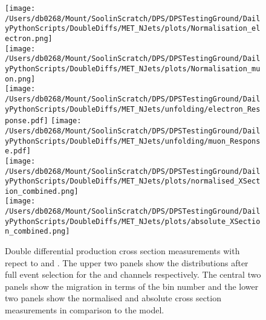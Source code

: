 \begin{figure}[htpb]
	\centering
	\texttt{[image: /Users/db0268/Mount/SoolinScratch/DPS/DPSTestingGround/DailyPythonScripts/DoubleDiffs/MET\_NJets/plots/Normalisation\_electron.png]} \\
	\texttt{[image: /Users/db0268/Mount/SoolinScratch/DPS/DPSTestingGround/DailyPythonScripts/DoubleDiffs/MET\_NJets/plots/Normalisation\_muon.png]} \\
	\vspace{0.8cm}
	\texttt{[image: /Users/db0268/Mount/SoolinScratch/DPS/DPSTestingGround/DailyPythonScripts/DoubleDiffs/MET\_NJets/unfolding/electron\_Response.pdf]}
	\texttt{[image: /Users/db0268/Mount/SoolinScratch/DPS/DPSTestingGround/DailyPythonScripts/DoubleDiffs/MET\_NJets/unfolding/muon\_Response.pdf]} \\
	\vspace{0.8cm}
	\texttt{[image: /Users/db0268/Mount/SoolinScratch/DPS/DPSTestingGround/DailyPythonScripts/DoubleDiffs/MET\_NJets/plots/normalised\_XSection\_combined.png]} \\
	\texttt{[image: /Users/db0268/Mount/SoolinScratch/DPS/DPSTestingGround/DailyPythonScripts/DoubleDiffs/MET\_NJets/plots/absolute\_XSection\_combined.png]} \\
	\vspace{0.4cm}
	\caption[Double differential \ttbar{} production cross section measurements with repect to \ptmiss{} and \NJET{}. The upper two panels show the distributions after full event selection for the \eJets{} and \muJets{} channels respectively. The central two panels show the migration in terms of the bin number and the lower two panels show the normalised and absolute cross section measurements in comparison to the \powhegpythia{} model.]{Double differential \ttbar{} production cross section measurements with repect to \ptmiss{} and \NJET{}. The upper two panels show the distributions after full event selection for the \eJets{} and \muJets{} channels respectively. The central two panels show the migration in terms of the bin number and the lower two panels show the normalised and absolute cross section measurements in comparison to the \powhegpythia{} model.}
	\label{fig:MET_NJET}
\end{figure}


